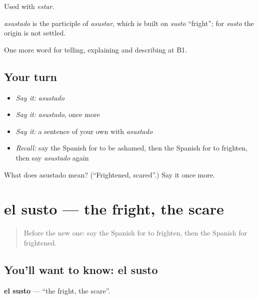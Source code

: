 Used with \emph{estar}.

\begin{cousinweb}
\emph{asustado} is the participle of \emph{asustar}, which is built on \emph{susto} \textquotedblleft{}fright\textquotedblright{}; for \emph{susto} the origin is not settled.
\end{cousinweb}

\begin{grammarlens}[title={What you've built}]
One more word for telling, explaining and describing at B1.
\end{grammarlens}

\subsection*{Your turn}
\begin{itemize}
\raggedright
  \item \emph{Say it:} \emph{asustado}
  \item \emph{Say it:} \emph{asustado}, once more
  \item \emph{Say it:} a sentence of your own with \emph{asustado}
  \item \emph{Recall:} say the Spanish for to be ashamed, then the Spanish for to frighten, then say \emph{asustado} again
\end{itemize}

\begin{tcolorbox}[breakable,colback=teal!4,colframe=teal!35!black,title={Before you move on}]
What does asustado mean? (\textquotedblleft{}Frightened, scared\textquotedblright{}.) Say it once more.
\end{tcolorbox}
\section[el susto]{el susto — the fright, the scare}

\label{lesson:ES-C706-susto}



\begin{quote}
Before the new one: say the Spanish for to frighten, then the Spanish for frightened.
\end{quote}

\subsection*{You'll want to know: el susto}
\textbf{el susto} — \textquotedblleft{}the fright, the scare\textquotedblright{}.

